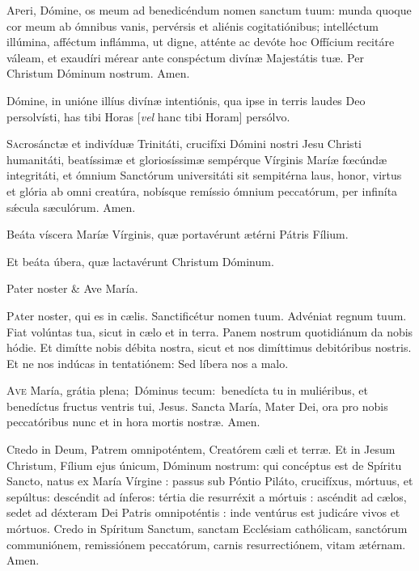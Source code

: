 \thispagestyle{empty}

\lettrine{A}{p}eri, Dómine, os meum ad benedicéndum nomen sanctum tuum: munda quoque cor meum ab ómnibus vanis, pervérsis et aliénis cogitatiónibus; intelléctum illúmina, afféctum inflámma, ut digne, atténte ac devóte hoc Offícium recitáre váleam, et exaudíri mérear ante conspéctum divínæ Majestátis tuæ. Per Christum Dóminum nostrum. \rr Amen.

Dómine, in unióne illíus divínæ intentiónis, qua ipse in terris laudes Deo persolvísti, has tibi Horas [\textit{vel} hanc tibi Horam] persólvo.


\lettrine{S}{a}crosánctæ et indivíduæ Trinitáti, crucifíxi Dómini nostri Jesu Christi humanitáti, beatíssimæ et gloriosíssimæ sempérque Vírginis Maríæ fœcúndæ integritáti, et ómnium Sanctórum universitáti sit sempitérna laus, honor, virtus et glória ab omni creatúra, nobísque remíssio ómnium peccatórum, per infiníta sǽcula sæculórum. \rr Amen.

\vv Beáta víscera Maríæ Vírginis, quæ portavérunt ætérni Pátris Fílium.

\rr Et beáta úbera, quæ lactavérunt Christum Dóminum.

Pater noster \& Ave María.

\myrule


\lettrine{P}{a}ter noster, qui es in cælis. Sanctificétur nomen tuum. Advéniat regnum tuum. Fiat volúntas tua, sicut in cælo et in terra. Panem nostrum quotidiánum da nobis hódie. Et dimítte nobis débita nostra, sicut et nos dimíttimus debitóribus nostris. Et ne nos indúcas in tentatiónem: Sed líbera nos a malo. 

\lettrine{A}{ve} María, grátia plena; Dóminus tecum:  benedícta tu in muliéribus, et benedíctus fructus ventris tui, Jesus. Sancta María, Mater Dei, ora pro nobis peccatóribus nunc et in hora mortis nostræ. Amen.

\lettrine{C}{r}edo in Deum, Patrem omnipoténtem, Creatórem cæli et terræ. Et in Jesum Christum, Fílium ejus únicum, Dóminum nostrum: qui concéptus est de Spíritu Sancto, natus ex María Vírgine : passus sub Póntio Piláto, crucifíxus, mórtuus, et sepúltus: descéndit ad ínferos: tértia die resurréxit a mórtuis : ascéndit ad cælos, sedet ad déxteram Dei Patris omnipoténtis : inde ventúrus est judicáre vivos et mórtuos. Credo in Spíritum Sanctum, sanctam Ecclésiam cathólicam, sanctórum communiónem, remissiónem peccatórum, carnis resurrectiónem, vitam ætérnam. Amen.